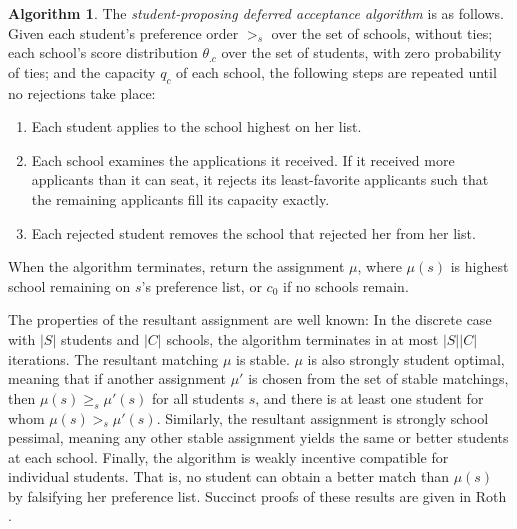 \documentclass[12pt]{article}
\theoremstyle{definition}
\newtheorem{algorithm}{Algorithm}
\begin{document}
\begin{algorithm} \label{studentproposingDA}
The \emph{student-proposing deferred acceptance algorithm} is as follows. Given each student's preference order $>_s$ over the set of schools, without ties;  each school's score distribution $\theta_{.c}$ over the set of students, with zero probability of ties; and the capacity $q_c$ of each school, the following steps are repeated until no rejections take place:
\begin{enumerate}
\item Each student applies to the school highest on her list.
\item Each school examines the applications it received. If it received more applicants than it can seat, it rejects its least-favorite applicants such that the remaining applicants fill its capacity exactly.
\item Each rejected student removes the school that rejected her from her list.
\end{enumerate}
When the algorithm terminates, return the assignment $\mu$, where $\mu(s)$ is highest school remaining on $s$'s preference list, or $c_0$ if no schools remain. 
\end{algorithm}
The properties of the resultant assignment are well known: In the discrete case with $|S|$ students and $|C|$ schools, the algorithm terminates in at most $|S||C|$ iterations. The resultant matching $\mu$ is stable. $\mu$ is also strongly student optimal, meaning that if another assignment $\mu'$ is chosen from the set of stable matchings, then $\mu(s) \geq_s \mu'(s)$ for all students $s$, and there is at least one student for whom $\mu(s) >_s \mu'(s)$. Similarly, the resultant assignment is strongly school pessimal, meaning any other stable assignment yields the same or better students at each school. Finally, the algorithm is weakly incentive compatible for individual students. That is, no student can obtain a better match than $\mu(s)$ by falsifying her preference list. Succinct proofs of these results are given in Roth \parencite*{economicsofmatching}.
\end{document}
